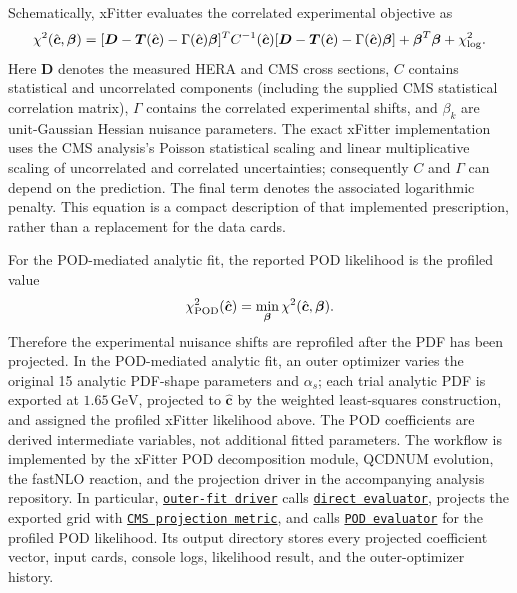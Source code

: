\documentclass[11pt]{article}
\newcommand{\incljetscode}[2]{\href{https://github.com/HephyAnalysisSW/InclJets/blob/main/#1}{\texttt{#2}}}
\begin{document}
Schematically, xFitter evaluates the correlated experimental objective as
\begin{equation}
 \chi^2(\hat{\boldsymbol c},\boldsymbol\beta) =
 [\boldsymbol D-\boldsymbol T(\hat{\boldsymbol c})
       -\Gamma(\hat{\boldsymbol c})\boldsymbol\beta]^T
 C^{-1}(\hat{\boldsymbol c})
 [\boldsymbol D-\boldsymbol T(\hat{\boldsymbol c})
       -\Gamma(\hat{\boldsymbol c})\boldsymbol\beta]
 +\boldsymbol\beta^T\boldsymbol\beta+\chi^2_{\rm log}.
\end{equation}
Here $\boldsymbol D$ denotes the measured HERA and CMS cross sections,
$C$ contains statistical and uncorrelated components (including the supplied
CMS statistical correlation matrix), $\Gamma$ contains the correlated
experimental shifts, and $\beta_k$ are unit-Gaussian Hessian nuisance
parameters.  The exact xFitter implementation uses the CMS analysis's
Poisson statistical scaling and linear multiplicative scaling of
uncorrelated and correlated uncertainties; consequently $C$ and $\Gamma$
can depend on the prediction.  The final term denotes the associated
logarithmic penalty.  This equation is a compact description of that
implemented prescription, rather than a replacement for the data cards.

For the POD-mediated analytic fit, the reported POD likelihood is the profiled
value
\begin{equation}
  \chi^2_{\rm POD}(\hat{\boldsymbol c}) =
  \min_{\boldsymbol\beta}\chi^2(\hat{\boldsymbol c},\boldsymbol\beta).
\end{equation}
Therefore the experimental nuisance shifts are reprofiled after the PDF has
been projected. In the POD-mediated analytic fit, an outer optimizer varies
the original 15 analytic PDF-shape parameters and $\alpha_s$; each trial
analytic PDF is exported at $1.65\,\mathrm{GeV}$, projected to
$\hat{\boldsymbol c}$ by the weighted least-squares construction, and assigned the profiled xFitter
likelihood above.  The POD coefficients are derived intermediate variables,
not additional fitted parameters. The workflow is implemented by the xFitter
POD decomposition module, QCDNUM evolution, the fastNLO reaction, and the
projection driver in the accompanying analysis repository. In particular,
\incljetscode{fits/SMP-22-014/figure2/pod_mediated_fit/run_fit.py}{outer-fit driver}
calls \incljetscode{fits/SMP-22-014/figure2/likelihood_scans/evaluate_direct.py}{direct evaluator},
projects the exported grid with
\incljetscode{fits/SMP-22-014/figure2/likelihood_scans/projection_metrics.py}{CMS projection metric},
and calls \incljetscode{fits/SMP-22-014/figure2/likelihood_scans/evaluate_pod.py}{POD evaluator}
for the profiled POD likelihood. Its output directory stores every projected
coefficient vector, input cards, console logs, likelihood result, and the
outer-optimizer history.
\end{document}
